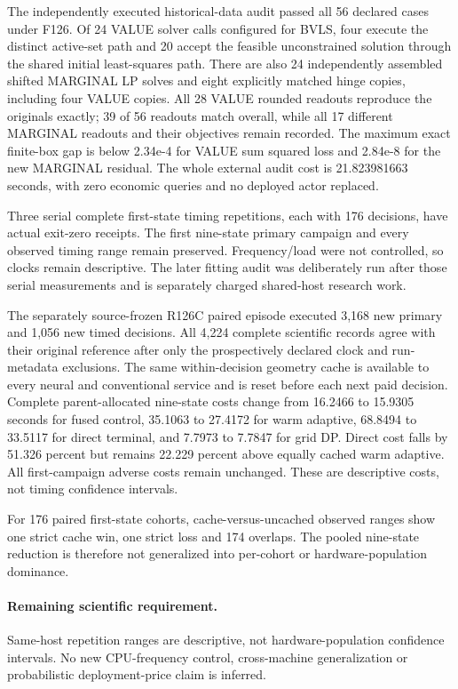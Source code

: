 The independently executed historical-data audit passed all 56 declared cases under F126. Of 24 VALUE solver calls configured for BVLS, four execute the distinct active-set path and 20 accept the feasible unconstrained solution through the shared initial least-squares path. There are also 24 independently assembled shifted MARGINAL LP solves and eight explicitly matched hinge copies, including four VALUE copies. All 28 VALUE rounded readouts reproduce the originals exactly; 39 of 56 readouts match overall, while all 17 different MARGINAL readouts and their objectives remain recorded. The maximum exact finite-box gap is below 2.34e-4 for VALUE sum squared loss and 2.84e-8 for the new MARGINAL residual. The whole external audit cost is 21.823981663 seconds, with zero economic queries and no deployed actor replaced.\par
Three serial complete first-state timing repetitions, each with 176 decisions, have actual exit-zero receipts. The first nine-state primary campaign and every observed timing range remain preserved. Frequency/load were not controlled, so clocks remain descriptive. The later fitting audit was deliberately run after those serial measurements and is separately charged shared-host research work.\par
The separately source-frozen R126C paired episode executed 3,168 new primary and 1,056 new timed decisions. All 4,224 complete scientific records agree with their original reference after only the prospectively declared clock and run-metadata exclusions. The same within-decision geometry cache is available to every neural and conventional service and is reset before each next paid decision. Complete parent-allocated nine-state costs change from 16.2466 to 15.9305 seconds for fused control, 35.1063 to 27.4172 for warm adaptive, 68.8494 to 33.5117 for direct terminal, and 7.7973 to 7.7847 for grid DP. Direct cost falls by 51.326 percent but remains 22.229 percent above equally cached warm adaptive. All first-campaign adverse costs remain unchanged. These are descriptive costs, not timing confidence intervals.\par
For 176 paired first-state cohorts, cache-versus-uncached observed ranges show one strict cache win, one strict loss and 174 overlaps. The pooled nine-state reduction is therefore not generalized into per-cohort or hardware-population dominance.\par

\paragraph{Remaining scientific requirement.} Same-host repetition ranges are descriptive, not hardware-population confidence intervals. No new CPU-frequency control, cross-machine generalization or probabilistic deployment-price claim is inferred.

